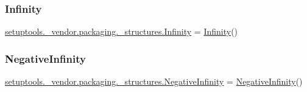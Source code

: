 \subsubsection{\texorpdfstring{Infinity}{Infinity}}
{\footnotesize\ttfamily \hyperlink{classsetuptools_1_1__vendor_1_1packaging_1_1__structures_1_1_infinity}{setuptools.\+\_\+vendor.\+packaging.\+\_\+structures.\+Infinity} = \hyperlink{classsetuptools_1_1__vendor_1_1packaging_1_1__structures_1_1_infinity}{Infinity}()}

\mbox{\label{namespacesetuptools_1_1__vendor_1_1packaging_1_1__structures_a3399602e5eb96fe48e27cff9be686e4c}} 
\subsubsection{\texorpdfstring{Negative\+Infinity}{NegativeInfinity}}
{\footnotesize\ttfamily \hyperlink{classsetuptools_1_1__vendor_1_1packaging_1_1__structures_1_1_negative_infinity}{setuptools.\+\_\+vendor.\+packaging.\+\_\+structures.\+Negative\+Infinity} = \hyperlink{classsetuptools_1_1__vendor_1_1packaging_1_1__structures_1_1_negative_infinity}{Negative\+Infinity}()}

